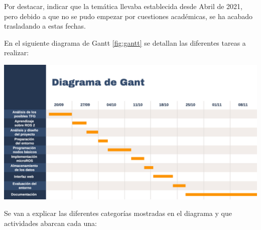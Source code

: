 Por destacar, indicar que la temática llevaba establecida desde Abril de 2021, pero debido a que no se pudo empezar por cuestiones académicas, se ha acabado trasladando a estas fechas.

En el siguiente diagrama de Gantt \ref{fig:gantt} se detallan las diferentes tareas a realizar:

\begin{center}
    \centering
    \includegraphics[width=\textwidth]{img/04-PreDiagrama-Gantt.png}
    \label{fig:pre-gantt}
\end{center}

Se van a explicar las diferentes categorías mostradas en el diagrama y que actividades abarcan cada una:

